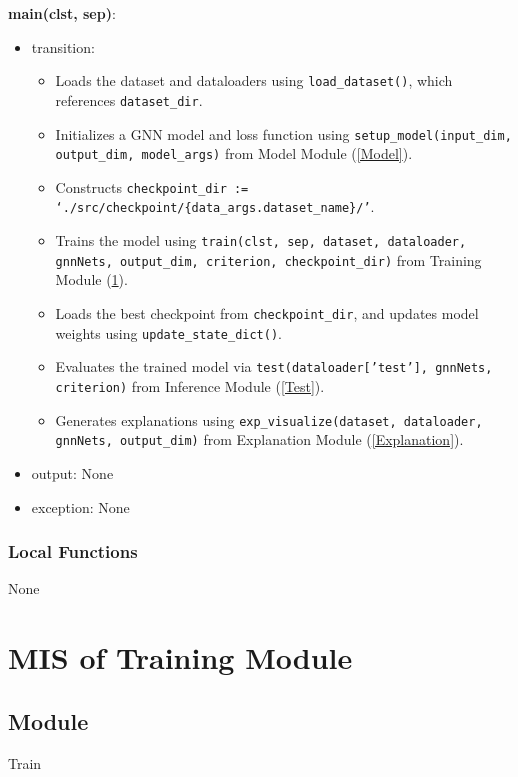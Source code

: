 \documentclass[12pt, titlepage]{article}
\begin{document}
\noindent \textbf{main(clst, sep)}:
\begin{itemize}
  \item transition:
  \begin{itemize}
    \item Loads the dataset and dataloaders using \texttt{load\_dataset()}, which references \texttt{dataset\_dir}.
    \item Initializes a GNN model and loss function using \texttt{setup\_model(input\_dim, output\_dim, model\_args)} from Model Module (\ref{Model}).
    \item Constructs \texttt{checkpoint\_dir := `./src/checkpoint/\{data\_args.dataset\_name\}/'}.
    \item Trains the model using \texttt{train(clst, sep, dataset, dataloader, gnnNets, output\_dim, criterion, checkpoint\_dir)} from Training Module (\ref{Train}).
    \item Loads the best checkpoint from \texttt{checkpoint\_dir}, and updates model weights using \texttt{update\_state\_dict()}.
    \item Evaluates the trained model via \texttt{test(dataloader['test'], gnnNets, criterion)} from Inference Module (\ref{Test}).
    \item Generates explanations using \texttt{exp\_visualize(dataset, dataloader, gnnNets, output\_dim)} from Explanation Module (\ref{Explanation}).
  \end{itemize}
  \item output: None
  \item exception: None
\end{itemize}

\subsubsection{Local Functions}
None




\newpage







\section{MIS of Training Module} \label{Train}

\subsection{Module}
Train
\end{document}
